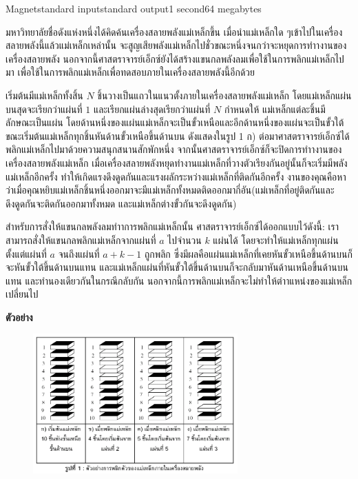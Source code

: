 \documentclass[11pt,a4paper]{article}
\begin{document}
\begin{problem}{Magnet}{standard input}{standard output}{1 second}{64 megabytes}

มหาวิทยาลัยชื่อดังแห่งหนึ่งได้คิดค้นเครื่องสลายพลังแม่เหล็กขึ้น เมื่อนำแม่เหล็กใด ๆเข้าไปในเครื่องสลายพลังนี้แล้วแม่เหล็กเหล่านั้น จะสูญเสียพลังแม่เหล็กไปชั่วขณะหนึ่งจนกว่าจะหยุดการทำางานของเครื่องสลายพลัง นอกจากนี้ศาสตราจารย์เอ็กซ์ยังได้สร้างแขนกลพลังลมเพื่อใช้ในการพลิกแม่เหล็กไปมา เพื่อใช้ในการพลิกแม่เหล็กเพื่อทดสอบภายในเครื่องสลายพลังนี้อีกด้วย

เริ่มต้นมีแม่เหล็กทั้งสิ้น $N$ ชิ้นวางเป็นแถวในแนวตั้งภายในเครื่องสลายพลังแม่เหล็ก โดยแม่เหล็กแผ่นบนสุดจะเรียกว่าแผ่นที่ $1$ และเรียกแผ่นล่างสุดเรียกว่าแผ่นที่ $N$ กำหนดให้ แม่เหล็กแต่ละชิ้นมีลักษณะเป็นแผ่น โดยด้านหนึ่งของแผ่นแม่เหล็กจะเป็นขั้วเหนือและอีกด้านหนึ่งของแผ่นจะเป็นขั้วใต้ ขณะเริ่มต้นแม่เหล็กทุกชิ้นหันด้านขั้วเหนือขึ้นด้านบน ดังแสดงในรูป 1 ก) ต่อมาศาสตราจารย์เอ็กซ์ได้พลิกแม่เหล็กไปมาด้วยความสนุกสนานสักพักหนึ่ง จากนั้นศาสตราจารย์เอ็กซ์ก็จะปิดการทำางานของเครื่องสลายพลังแม่เหล็ก เมื่อเครื่องสลายพลังหยุดทำงานแม่เหล็กที่วางตัวเรียงกันอยู่นั้นก็จะเริ่มมีพลังแม่เหล็กอีกครั้ง ทำให้เกิดแรงดึงดูดกันและแรงผลักระหว่างแม่เหล็กที่ติดกันอีกครั้ง งานของคุณคือหาว่าเมื่อคุณหยิบแม่เหล็กชิ้นหนึ่งออกมาจะมีแม่เหล็กทั้งหมดติดออกมากี่อัน(แม่เหล็กที่อยู่ติดกันและดึงดูดกันจะติดกันออกมาทั้งหมด และแม่เหล็กต่างขั้วกันจะดึงดูดกัน)

สำหรับการสั่งให้แขนกลพลังลมทำาการพลิกแม่เหล็กนั้น ศาสตราจารย์เอ็กซ์ได้ออกแบบไว้ดังนี้: เราสามารถสั่งให้แขนกลพลิกแม่เหล็กจากแผ่นที่ $a$ ไปจำนวน $k$ แผ่นได้ โดยจะทำให้แม่เหล็กทุกแผ่นตั้งแต่แผ่นที่ $a$ จนถึงแผ่นที่ $a + k - 1$ ถูกพลิก ซึ่งมีผลคือแผ่นแม่เหล็กที่เคยหันขั้วเหนือขึ้นด้านบนก็จะหันขั้วใต้ขึ้นด้านบนแทน และแม่เหล็กแผ่นที่หันขั้วใต้ขึ้นด้านบนก็จะกลับมาหันด้านเหนือขึ้นด้านบนแทน และทำนองเดียวกันในกรณีกลับกัน นอกจากนี้การพลิกแม่เหล็กจะไม่ทำให้ตำาแหน่งของแม่เหล็กเปลี่ยนไป

\bigskip
\textbf{ตัวอย่าง}

\begin{figure}[h]
\centering
\includegraphics[width=0.7\textwidth]{../latex/img/1029/1029-1.png}
\end{figure}



\end{problem}
\end{document}
